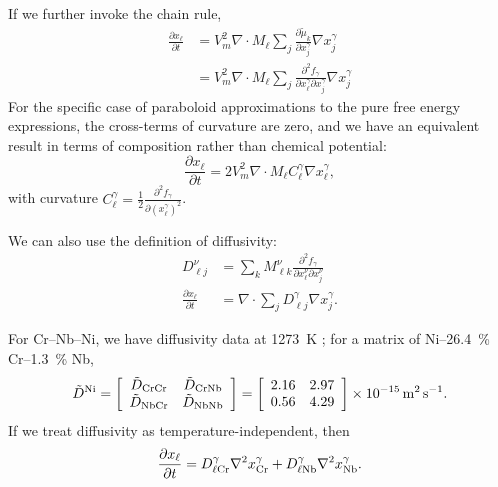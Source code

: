 \documentclass[10pt]{article}
\begin{document}
		If we further invoke the chain rule,
		\begin{align}
			\frac{\partial x_{\ell}}{\partial t} &= V_m^2 \nabla\cdot M_{\ell}\sum_j\frac{\partial \tilde{\mu}_k}{\partial x_j^{\gamma}}\nabla x_j^{\gamma}\\
			                                     &= V_m^2 \nabla\cdot M_{\ell}\sum_j\frac{\partial^2 f_{\gamma}}{\partial x_{\ell}^{\gamma} \partial x_j^{\gamma}}\nabla x_j^{\gamma}
		\end{align}
		For the specific case of paraboloid approximations to the pure free energy expressions, the cross-terms of curvature are zero,
		and we have an equivalent result in terms of composition rather than chemical potential:
		\begin{equation}
			\frac{\partial x_{\ell}}{\partial t} = 2V_m^2 \nabla\cdot M_{\ell}C_{\ell}^{\gamma}\nabla x_{\ell}^{\gamma},\label{eqn:interdiff}
		\end{equation}
		with curvature $C_{\ell}^{\gamma}=\frac{1}{2}\frac{\partial^2 f_{\gamma}}{\partial \left({x_{\ell}^{\gamma}}\right)^2}$.
		
		We can also use the definition of diffusivity:
		\begin{align}
			D_{\ell j}^{\nu} &= \sum_k M_{\ell k}^{\nu}\frac{\partial^2 f_{\gamma}}{\partial x_{\ell}^{\nu} \partial x_j^{\nu}}\\
			\frac{\partial x_{\ell}}{\partial t} &= \nabla\cdot\sum_j D_{\ell j}^{\gamma} \nabla x_j^{\gamma}.
		\end{align}

		For Cr--Nb--Ni, we have diffusivity data at \SI{1273}{\kelvin} \cite{Xu2016};
		for a matrix of Ni--\SI{26.4}{\percent} Cr--\SI{1.3}{\percent} Nb,
		\begin{equation}\label{eqn:diffusion}
			\tilde{D}^{\ce{Ni}} = \left[\begin{array}{cc}
			                            \tilde{D}_{\mathrm{CrCr}} & \tilde{D}_{\mathrm{CrNb}}\\
			                            \tilde{D}_{\mathrm{NbCr}} & \tilde{D}_{\mathrm{NbNb}}
		                                \end{array}
		                          \right]
			                    = \left[\begin{array}{cc}
			                            2.16 & 2.97\\
			                            0.56 & 4.29
		                                \end{array}
		                          \right] \times \SI{e-15}{\meter\squared\per\second}.
		\end{equation}
		If we treat diffusivity as temperature-independent, then
		\begin{equation}
			\frac{\partial x_{\ell}}{\partial t} = D_{\ell\ce{Cr}}^{\gamma}\nabla^2 x_{\ce{Cr}}^{\gamma} + D_{\ell\ce{Nb}}^{\gamma}\nabla^2 x_{\ce{Nb}}^{\gamma}.
		\end{equation}
		
\end{document}
